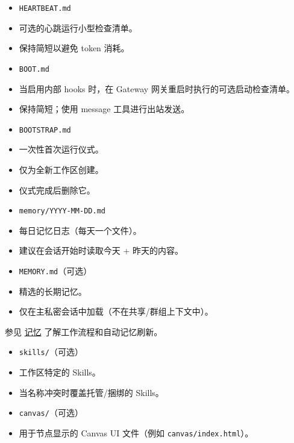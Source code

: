 \begin{itemize}
  \item \texttt{HEARTBEAT.md}
  \item 可选的心跳运行小型检查清单。
  \item 保持简短以避免 token 消耗。
\end{itemize}


\begin{itemize}
  \item \texttt{BOOT.md}
  \item 当启用内部 hooks 时，在 Gateway 网关重启时执行的可选启动检查清单。
  \item 保持简短；使用 message 工具进行出站发送。
\end{itemize}


\begin{itemize}
  \item \texttt{BOOTSTRAP.md}
  \item 一次性首次运行仪式。
  \item 仅为全新工作区创建。
  \item 仪式完成后删除它。
\end{itemize}


\begin{itemize}
  \item \texttt{memory/YYYY-MM-DD.md}
  \item 每日记忆日志（每天一个文件）。
  \item 建议在会话开始时读取今天 + 昨天的内容。
\end{itemize}


\begin{itemize}
  \item \texttt{MEMORY.md}（可选）
  \item 精选的长期记忆。
  \item 仅在主私密会话中加载（不在共享/群组上下文中）。
\end{itemize}


参见 \href{/concepts/memory}{记忆} 了解工作流程和自动记忆刷新。

\begin{itemize}
  \item \texttt{skills/}（可选）
  \item 工作区特定的 Skills。
  \item 当名称冲突时覆盖托管/捆绑的 Skills。
\end{itemize}


\begin{itemize}
  \item \texttt{canvas/}（可选）
  \item 用于节点显示的 Canvas UI 文件（例如 \texttt{canvas/index.html}）。
\end{itemize}


